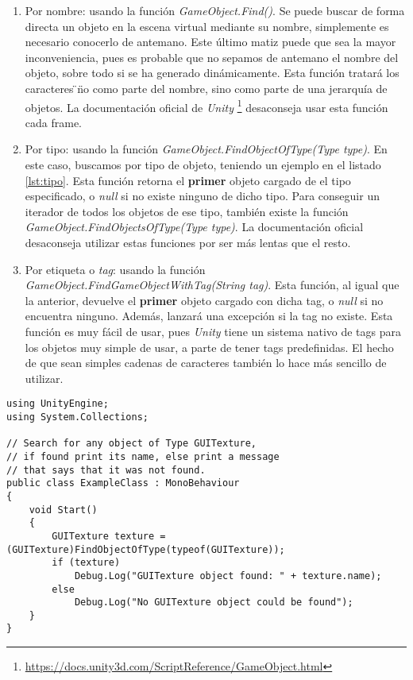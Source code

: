\documentclass{pre-tfg}
\begin{document}
\begin{enumerate}
\item Por nombre: usando la función \textit{GameObject.Find()}. Se puede buscar de forma directa un objeto en la escena virtual mediante su nombre, simplemente es necesario conocerlo de antemano. Este último matiz puede que sea la mayor inconveniencia, pues es probable que no sepamos de antemano el nombre del objeto, sobre todo si se ha generado dinámicamente. Esta función tratará los caracteres \"\/\" no como parte del nombre, sino como parte de una jerarquía de objetos. La documentación oficial de \textit{Unity} \footnote{\url{https://docs.unity3d.com/ScriptReference/GameObject.html}} \cite{unityreference} desaconseja usar esta función cada frame.
\item Por tipo: usando la función \textit{GameObject.FindObjectOfType(Type type)}. En este caso, buscamos por tipo de objeto, teniendo un ejemplo en el listado \ref{lst:tipo}.
 Esta función retorna el \textbf{primer} objeto cargado de el tipo especificado, o \textit{null} si no existe ninguno de dicho tipo. Para conseguir un iterador de todos los objetos de ese tipo, también existe la función \textit{GameObject.FindObjectsOfType(Type type)}. La documentación oficial desaconseja utilizar estas funciones por ser más lentas que el resto.
\item Por etiqueta o \textit{tag}: usando la función \textit{GameObject.FindGameObjectWithTag(String tag)}. Esta función, al igual que la anterior, devuelve el \textbf{primer} objeto cargado con dicha tag, o \textit{null} si no encuentra ninguno. Además, lanzará una excepción si la tag no existe. Esta función es muy fácil de usar, pues \textit{Unity} tiene un sistema nativo de tags para los objetos muy simple de usar, a parte de tener tags predefinidas. El hecho de que sean simples cadenas de caracteres también lo hace más sencillo de utilizar. 
\end{enumerate}

\begin{spacing}{1}
\begin{lstlisting}[float=htbp, caption=Búsqueda de objetos por tipo, label=lst:tipo]
using UnityEngine;
using System.Collections;

// Search for any object of Type GUITexture,
// if found print its name, else print a message
// that says that it was not found.
public class ExampleClass : MonoBehaviour
{
    void Start()
    {
        GUITexture texture = (GUITexture)FindObjectOfType(typeof(GUITexture));
        if (texture)
            Debug.Log("GUITexture object found: " + texture.name);
        else
            Debug.Log("No GUITexture object could be found");
    }
}
\end{lstlisting}
\end{spacing}
\end{document}
